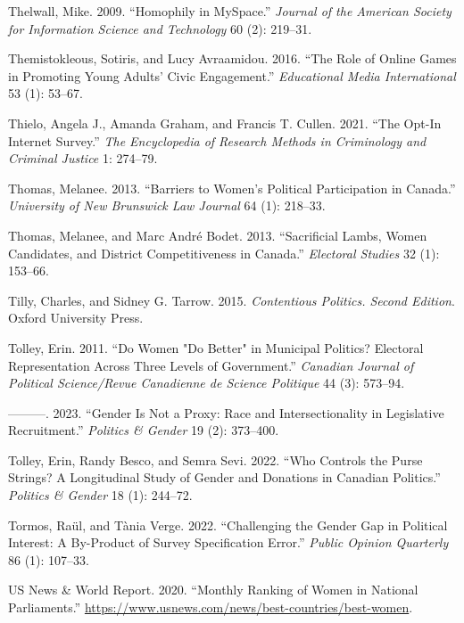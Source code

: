 \documentclass[
  letterpaper,
  DIV=11,
  numbers=noendperiod]{scrreprt}
\newlength{\cslhangindent}
\newenvironment{CSLReferences}[2] %
 {\begin{list}{}{%
  \setlength{\itemindent}{0pt}
  \setlength{\leftmargin}{0pt}
  \setlength{\parsep}{0pt}
  \ifodd #1
   \setlength{\leftmargin}{\cslhangindent}
   \setlength{\itemindent}{-1\cslhangindent}
  \fi
  \setlength{\itemsep}{#2\baselineskip}}}
 {\end{list}}
\begin{document}
\begin{CSLReferences}{1}{0}
Thelwall, Mike. 2009. {``{Homophily in MySpace}.''} \emph{Journal of the
American Society for Information Science and Technology} 60 (2):
219--31.

Themistokleous, Sotiris, and Lucy Avraamidou. 2016. {``{The Role of
Online Games in Promoting Young Adults' Civic Engagement}.''}
\emph{Educational Media International} 53 (1): 53--67.

Thielo, Angela J., Amanda Graham, and Francis T. Cullen. 2021. {``{The
Opt-In Internet Survey}.''} \emph{The Encyclopedia of Research Methods
in Criminology and Criminal Justice} 1: 274--79.

Thomas, Melanee. 2013. {``{Barriers to Women's Political Participation
in Canada}.''} \emph{University of New Brunswick Law Journal} 64 (1):
218--33.

Thomas, Melanee, and Marc André Bodet. 2013. {``{Sacrificial Lambs,
Women Candidates, and District Competitiveness in Canada}.''}
\emph{Electoral Studies} 32 (1): 153--66.

Tilly, Charles, and Sidney G. Tarrow. 2015. \emph{{Contentious Politics.
Second Edition}}. Oxford University Press.

Tolley, Erin. 2011. {``{Do Women "Do Better" in Municipal Politics?
Electoral Representation Across Three Levels of Government}.''}
\emph{Canadian Journal of Political Science/Revue Canadienne de Science
Politique} 44 (3): 573--94.

---------. 2023. {``{Gender Is Not a Proxy: Race and Intersectionality
in Legislative Recruitment}.''} \emph{Politics \& Gender} 19 (2):
373--400.

Tolley, Erin, Randy Besco, and Semra Sevi. 2022. {``{Who Controls the
Purse Strings? A Longitudinal Study of Gender and Donations in Canadian
Politics}.''} \emph{Politics \& Gender} 18 (1): 244--72.

Tormos, Raül, and Tània Verge. 2022. {``{Challenging the Gender Gap in
Political Interest: A By-Product of Survey Specification Error}.''}
\emph{Public Opinion Quarterly} 86 (1): 107--33.

US News \& World Report. 2020. {``{Monthly Ranking of Women in National
Parliaments}.''}
\url{https://www.usnews.com/news/best-countries/best-women}.


\end{CSLReferences}
\end{document}
